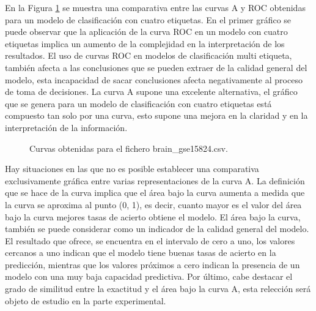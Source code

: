 \bigbreak

En la Figura \ref{fig:2} se muestra una comparativa entre las curvas A y ROC obtenidas para un modelo de clasificación con cuatro etiquetas. En el primer gráfico se puede observar que la aplicación de la curva ROC en un modelo con cuatro etiquetas implica un aumento de la complejidad en la interpretación de los resultados. El uso de curvas ROC en modelos de clasificación multi etiqueta, también afecta a las conclusiones que se pueden extraer de la calidad general del modelo, esta incapacidad de sacar conclusiones afecta negativamente al proceso de toma de decisiones. La curva A supone una excelente alternativa, el gráfico que se genera para un modelo de clasificación con cuatro etiquetas está compuesto tan solo por una curva, esto supone una mejora en la claridad y en la interpretación de la información. 

\bigbreak

\begin{figure}[htp]
    \centering
    \caption{Curvas obtenidas para el fichero brain\_gse15824.csv.}
    \label{fig:2}
\end{figure}

\bigbreak


Hay situaciones en las que no es posible establecer una comparativa exclusivamente gráfica entre varias representaciones de la curva A. La definición que se hace de la curva implica que el área bajo la curva aumenta a medida que la curva se aproxima al punto (0, 1), es decir, cuanto mayor es el valor del área bajo la curva mejores tasas de acierto obtiene el modelo. El área bajo la curva, también se puede considerar como un indicador de la calidad general del modelo. El resultado que ofrece, se encuentra en el intervalo de cero a uno, los valores cercanos a uno indican que el modelo tiene buenas tasas de acierto en la predicción, mientras que los valores próximos a cero indican la presencia de un modelo con una muy baja capacidad predictiva. Por último, cabe destacar el grado de similitud entre la exactitud y el área bajo la curva A, esta relección será objeto de estudio en la parte experimental.

\clearpage
